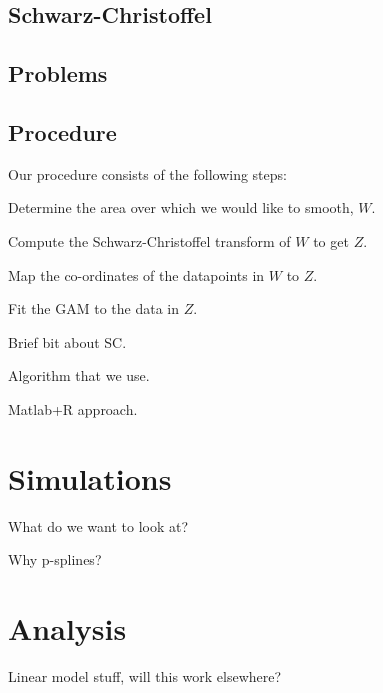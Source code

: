 \documentclass[a4paper,10pt]{amsart}
\newcommand{\sch}{Schwarz-Christoffel }
\begin{document}
\subsection{\sch}


\subsection{Problems}


\subsection{Procedure}

Our procedure consists of the following steps:

Determine the area over which we would like to smooth, $W$.

Compute the \sch transform of $W$ to get $Z$.

Map the co-ordinates of the datapoints in $W$ to $Z$.

Fit the GAM to the data in $Z$.







Brief bit about SC.

Algorithm that we use.

Matlab+R approach.



\section{Simulations}

What do we want to look at?

Why p-splines?


\section{Analysis}


Linear model stuff, will this work elsewhere?
















\end{document}
